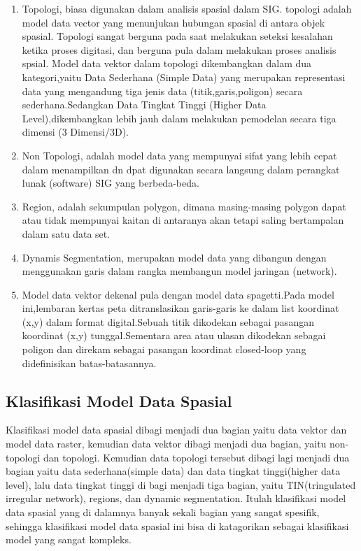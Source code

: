 \begin{enumerate} 
\item Topologi, biasa digunakan dalam analisis spasial dalam SIG. topologi adalah model data vector yang menunjukan hubungan spasial di antara objek spasial. Topologi sangat berguna pada saat melakukan seteksi kesalahan ketika proses digitasi, dan berguna pula dalam melakukan proses analisis spsial.
Model data vektor dalam topologi dikembangkan dalam dua kategori,yaitu Data Sederhana (Simple Data) yang merupakan representasi data yang mengandung tiga jenis data (titik,garis,poligon) secara sederhana.Sedangkan Data Tingkat Tinggi (Higher Data Level),dikembangkan lebih jauh dalam melakukan pemodelan secara tiga dimensi (3 Dimensi/3D).
\item Non Topologi, adalah model data yang mempunyai sifat yang lebih cepat dalam menampilkan dn dpat digunakan secara langsung dalam perangkat lunak (software) SIG yang berbeda-beda.
\item Region, adalah sekumpulan polygon, dimana masing-masing polygon dapat atau tidak mempunyai kaitan di antaranya akan tetapi saling bertampalan dalam satu data set.
\item Dynamis Segmentation, merupakan model data yang dibangun dengan menggunakan garis dalam rangka membangun model jaringan (network).
\item Model data vektor dekenal pula dengan model data spagetti.Pada model ini,lembaran kertas peta ditranslasikan garis-garis 
ke dalam list koordinat (x,y) dalam format digital.Sebuah titik dikodekan sebagai pasangan koordinat (x,y) tunggal.Sementara area atau ulasan dikodekan sebagai poligon dan direkam sebagai pasangan koordinat closed-loop yang didefinisikan batas-batasannya.
\end{enumerate}
\cite{Janner2010rekayasa}

\subsection{Klasifikasi Model Data Spasial}
Klasifikasi model data spasial dibagi menjadi dua bagian yaitu data vektor dan model data raster, kemudian data vektor dibagi menjadi dua bagian, yaitu non-topologi dan topologi. Kemudian data topologi tersebut dibagi lagi menjadi dua bagian yaitu data sederhana(simple data) dan data tingkat tinggi(higher data level), lalu data tingkat tinggi di bagi menjadi tiga bagian, yaitu TIN(tringulated irregular network), regions, dan dynamic segmentation. Itulah klasifikasi model data spasial yang di dalamnya banyak sekali bagian yang sangat spesifik, sehingga klasifikasi model data spasial ini bisa di katagorikan sebagai klasifikasi model yang sangat kompleks.

